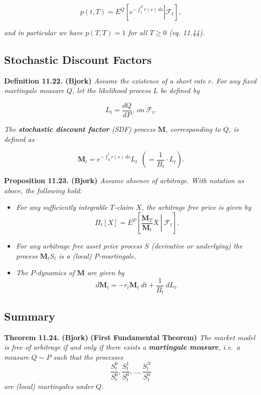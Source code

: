 \documentclass[
]{book}
\providecommand{\tightlist}{%
  \setlength{\itemsep}{0pt}\setlength{\parskip}{0pt}}
\begin{document}
\[
p(t,T)=E^Q\left[\left.e^{-\int_t^Tr(s)\ ds}\right\vert \mathcal{F}_t\right],\tag{11.43}
\]

\emph{and in particular we have \(p(T,T)=1\) for all \(T\ge 0\) (eq. 11.44).}

\hypertarget{stochastic-discount-factors-1}{%
\subsection{Stochastic Discount Factors}\label{stochastic-discount-factors-1}}

\textbf{Definition 11.22. (Bjork)} \emph{Assume the existence of a short rate \(r\). For any fixed martingale measure \(Q\), let the likelihood process \(L\) be defined by}

\[
L_t=\frac{dQ}{dP},\ on\ \mathcal{F}_t.\tag{11.48}
\]

\emph{The \textbf{stochastic discount factor} (SDF) process \(\mathbf{M}\), corresponding to \(Q\), is defined as}

\[
\mathbf{M}_t=e^{-\int_0^tr(s)\ ds}L_t\ \ \left(=\frac{1}{B_t}\cdot L_t\right).\tag{11.49/50}
\]

\textbf{Proposition 11.23. (Bjork)} \emph{Assume absence of arbitrage. With notation as above, the following hold:}

\begin{itemize}
\tightlist
\item
  \emph{For any sufficiently integrable \(T\)-claim \(X\), the arbitrage free price is given by}
  \[
    \Pi_t[X]=E^P\left[\left. \frac{\mathbf{M}_T}{\mathbf{M}_t} X \ \right\vert\ \mathcal{F}_t\right].\tag{11.51}
    \]
\item
  \emph{For any arbitrage free asset price process \(S\) (derivative or underlying) the process \(\mathbf{M}_tS_t\) is a (local) \(P\)-martingale.}
\item
  \emph{The \(P\)-dynamics of \(\mathbf{M}\) are given by}
  \[
    d\mathbf{M}_t=-r_t\mathbf{M}_t\ dt+\frac{1}{B_t}\ dL_t.\tag{11.53}
    \]
\end{itemize}

\hypertarget{summary}{%
\subsection{Summary}\label{summary}}

\textbf{Theorem 11.24. (Bjork)} \textbf{(First Fundamental Theorem)} \emph{The market model is free of arbitrage if and only if there exists a \textbf{martingale measure}, i.e.~a measure \(Q\sim P\) such that the processes}
\[
\frac{S_t^0}{S_t^0},\frac{S_t^1}{S_t^0},...,\frac{S_t^N}{S_t^0}
\]
\emph{are (local) martingales under \(Q\).}
\end{document}
